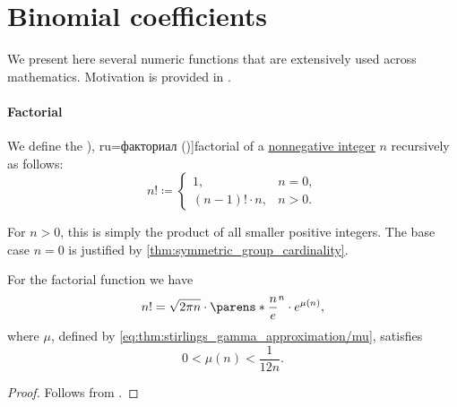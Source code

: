 \section{Binomial coefficients}\label{sec:binomial_coefficients}

We present here several numeric functions that are extensively used across mathematics. Motivation is provided in .

\paragraph{Factorial}

\begin{definition}\label{def:factorial}
  We define the \term[bg=факториел (\cite[129]{Тагамлицки1971ДиференциалноСмятане}), ru=факториал (\cite[145]{Гончаров1952ФункцииДействительногоПеременного})]{factorial} of a \hyperref[def:integer_signum]{nonnegative integer} \( n \) recursively as follows:
  \begin{equation}\label{eq:def:factorial}
    n! \coloneqq \begin{cases}
      1,                &n = 0, \\
      (n - 1)! \cdot n, &n > 0.
    \end{cases}
  \end{equation}
\end{definition}
\begin{comments}
  \item For \( n > 0 \), this is simply the product of all smaller positive integers. The base case \( n = 0 \) is justified by \cref{thm:symmetric_group_cardinality}.
\end{comments}

\begin{theorem}\label{thm:stirlings_factorial_approximation}
  For the factorial function we have
  \begin{equation*}
    n! = \sqrt{2 \pi n} \cdot \parens*{ \frac n e }^n \cdot e^{\mu(n)},
  \end{equation*}
  where \( \mu \), defined by \eqref{eq:thm:stirlings_gamma_approximation/mu}, satisfies
  \begin{equation*}
    0 < \mu(n) < \frac 1 {12n}.
  \end{equation*}
\end{theorem}
\begin{proof}
  Follows from .
\end{proof}

